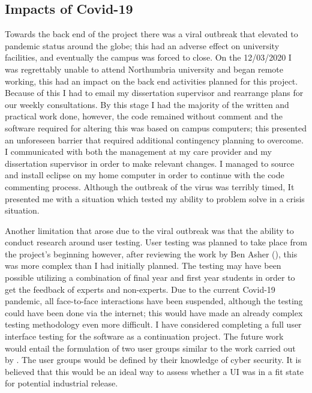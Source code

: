 \subsection{Impacts of Covid-19}

Towards the back end of the project there was a viral outbreak that elevated to pandemic status around the globe; this had an adverse effect on university facilities, and eventually the campus was forced to close. On the 12/03/2020 I was regrettably unable to attend Northumbria university and began remote working, this had an impact on the back end activities planned for this project. Because of this I had to email my dissertation supervisor and rearrange plans for our weekly consultations. By this stage I had the majority of the written and practical work done, however, the code remained without comment and the software required for altering this was based on campus computers; this presented an unforeseen barrier that required additional contingency planning to overcome. I communicated with both the management at my care provider and my dissertation supervisor in order to make relevant changes. I managed to source and install eclipse on my home computer in order to continue with the code commenting process. Although the outbreak of the virus was terribly timed, It presented me with a situation which tested my ability to problem solve in a crisis situation. 


Another limitation that arose due to the viral outbreak was that the ability to conduct research around user testing. User testing was planned to take place from the project's beginning however, after reviewing the work by Ben Asher (\citeyear{ben2015effects}), this was more complex than I had initially planned. The testing may have been possible utilizing a combination of final year and first year students in order to get the feedback of experts and non-experts. Due to the current Covid-19 pandemic, all face-to-face interactions have been suspended, although the testing could have been done via the internet; this would have made an already complex testing methodology even more difficult. I have considered completing a full user interface testing for the software as a continuation project. The future work would entail the formulation of two user groups similar to the work carried out by \citeauthor{ben2015effects}. The user groups would be defined by their knowledge of cyber security. It is believed that this would be an ideal way to assess whether a UI was in a fit state for potential industrial release. 






 

